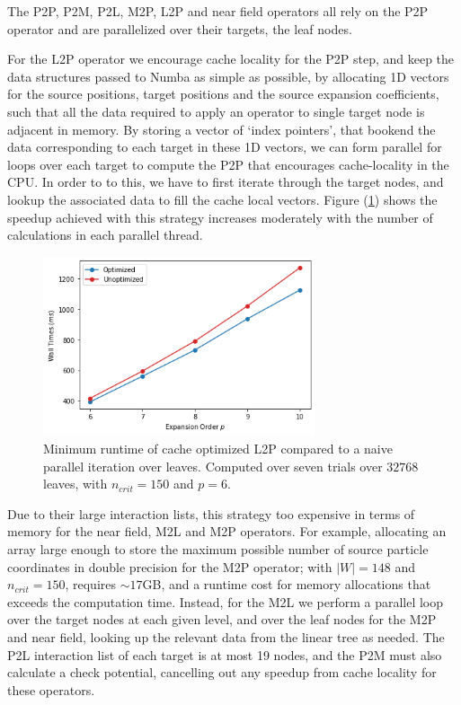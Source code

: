 \documentclass{IEEEcsmag}
\begin{document}
The P2P, P2M, P2L, M2P, L2P and near field operators all rely on the P2P operator and are parallelized over their targets, the leaf nodes.

For the L2P operator we encourage cache locality for the P2P step, and keep the data structures passed to Numba as simple as possible, by allocating 1D vectors for the source positions, target positions and the source expansion coefficients, such that all the data required to apply an operator to single target node is adjacent in memory. By storing a vector of `index pointers', that bookend the data corresponding to each target in these 1D vectors, we can form parallel for loops over each target to compute the P2P that encourages cache-locality in the CPU. In order to to this, we have to first iterate through the target nodes, and lookup the associated data to fill the cache local vectors. Figure (\ref{fig:l2p_cache}) shows the speedup achieved with this strategy increases moderately with the number of calculations in each parallel thread.


\begin{figure}
	\centerline{\includegraphics[width=8cm]{figures/speedup.png}}
    \caption{Minimum runtime of cache optimized L2P compared to a naive parallel iteration over leaves. Computed over seven trials over $32768$ leaves, with $n_{crit}=150$ and $p=6$.}
	\label{fig:l2p_cache}
\end{figure}


Due to their large interaction lists, this strategy too expensive in terms of memory for the near field, M2L and M2P operators. For example, allocating an array large enough to store the maximum possible number of source particle coordinates in double precision for the M2P operator; with $|W|=148$ and $n_{crit}=150$, requires $\sim 17$GB, and a runtime cost for memory allocations that exceeds the computation time. Instead, for the M2L we perform a parallel loop over the target nodes at each given level, and over the leaf nodes for the M2P and near field, looking up the relevant data from the linear tree as needed. The P2L interaction list of each target is at most 19 nodes, and the P2M must also calculate a check potential, cancelling out any speedup from cache locality for these operators.
\end{document}
